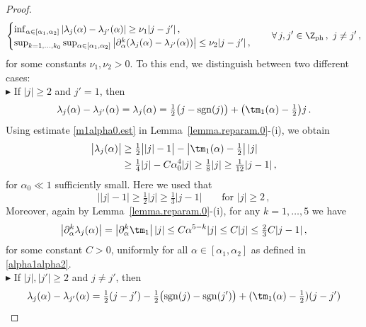 \documentclass[a4paper,reqno,10pt]{article}
\newcommand{\pa}{\partial}
\begin{document}
\begin{proof}
    \begin{equation}\label{gap.claim}
           \begin{cases}
        \inf_{\alpha\in[\alpha_{1},\alpha_{2}]}|\lambda_{j}(\alpha)-\lambda_{j'}(\alpha)| \geq  \nu_{1}|j-j'|\,, \\
         \sup_{k=1,...,k_0} \sup_{\alpha\in [\alpha_{1},\alpha_{2}]}\big|\pa_{\alpha}^k(\lambda_{j}(\alpha)-\lambda_{j'}(\alpha))\big|  \leq \nu_{2}|j-j'|\,,
    \end{cases} \quad      \forall\,j,j'\in \Z_{\rm ph}\,, \ j\neq j'\,,
    \end{equation}
    for some constants $\nu_1,\nu_2>0.$ To this end, we distinguish between two different cases:
    \\[1mm]
   \noindent $\blacktriangleright$ If $|j|\geq 2$ and $j'=1$, then
\begin{align}
\lambda_{j}(\alpha)-\lambda_{j'}(\alpha)
= \lambda_{j}(\alpha)
= \tfrac12 \big(j-\mathrm{sgn}(j)\big)
+ \big(\tm_{1}(\alpha)-\tfrac12\big)j \,.
\end{align}
Using estimate \eqref{m1alpha0.est} in Lemma~\ref{lemma.reparam.0}-(i), we obtain
\begin{align}
\big| \lambda_{j}(\alpha) \big|
&\geq \tfrac12 \big||j|-1\big|
     - \big|\tm_{1}(\alpha)-\tfrac12\big|\,|j| \\
&\geq \tfrac14 |j| - C \alpha_0^4 |j|
 \geq \tfrac18 |j|
 \geq \tfrac{1}{12} |j-1| \,,
\end{align}
for $\alpha_0 \ll 1$ sufficiently small. Here we used that
\[
\big||j|-1\big| \geq \tfrac12 |j| \geq \tfrac13 |j-1| \qquad \text{for } |j|\geq 2 \,,
\]
Moreover, again by Lemma~\ref{lemma.reparam.0}-(i), for any $k=1,\dots,5$ we have
\begin{align}
\big|\partial_\alpha^k \lambda_{j}(\alpha)\big|
= \big|\partial_\alpha^k \tm_{1}\big|\,|j|
\leq C \alpha^{5-k} |j|
\leq C |j|
\leq \tfrac23 C |j-1| \,,
\end{align}
for some constant $C>0$, uniformly for all $\alpha\in[\alpha_1,\alpha_2]$ as defined in
\eqref{alpha1alpha2}.
\\[1mm]
		\noindent $\blacktriangleright$ If $|j|, |j'|\geq 2$ and $j\neq j'$, then
		\begin{align}
				\lambda_{j}(\alpha)-\lambda_{j'}(\alpha) & = \tfrac12 (j-j') - \tfrac12\big({\rm sgn}(j) -{\rm sgn}(j') \big) + (\tm_{1}(\alpha)-\tfrac12)(j-j') \\

\end{align}
\end{proof}
\end{document}

